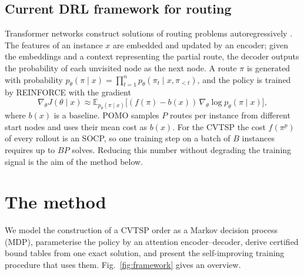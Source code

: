 \documentclass[preprint,review,12pt,authoryear]{elsarticle}
\begin{document}
\subsection{Current DRL framework for routing}\label{sec:pomo}
Transformer networks construct solutions of routing problems autoregressively \citep{kool2019attention,kwon2020pomo}.
The features of an instance $x$ are embedded and updated by an encoder; given the embeddings and a context
representing the partial route, the decoder outputs the probability of each unvisited node as the next node.
A route $\pi$ is generated with probability $p_\theta(\pi\mid x)=\prod_{t=1}^{n}p_\theta(\pi_t\mid x,\pi_{<t})$,
and the policy is trained by REINFORCE \citep{williams1992simple} with the gradient
\begin{equation}\label{eq:reinforce}
\nabla_\theta J(\theta\mid x)\approx\mathbb{E}_{p_\theta(\pi\mid x)}
\big[(f(\pi)-b(x))\,\nabla_\theta\log p_\theta(\pi\mid x)\big],
\end{equation}
where $b(x)$ is a baseline. POMO samples $P$ routes per instance from different start nodes and uses their mean
cost as $b(x)$. For the CVTSP the cost $f(\pi^p)$ of every rollout is an SOCP, so one training step on a batch of
$B$ instances requires up to $BP$ solves. Reducing this number without degrading the training signal is the aim
of the method below.

\section{The method}\label{sec:method}

We model the construction of a CVTSP order as a Markov decision process (MDP), parameterise the policy by an
attention encoder--decoder, derive certified bound tables from one exact solution, and present the
self-improving training procedure that uses them. Fig.~\ref{fig:framework} gives an overview.
\end{document}
